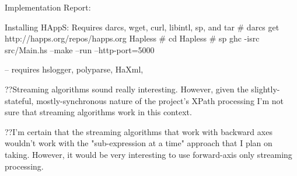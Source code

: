 Implementation Report:


Installing HAppS:
Requires darcs, wget, curl, libintl, sp, and tar
# darcs get http://happs.org/repos/happs.org Hapless
# cd Hapless
# sp ghc -isrc src/Main.hs --make --run --http-port=5000 

-- requires hslogger, polyparse, HaXml, 




??Streaming algorithms \cite{barton:streaming} sound really interesting.  However, given the slightly-stateful, mostly-synchronous nature of the project's XPath processing I'm not sure that streaming algorithms work in this context.  

??I'm certain that the streaming algorithms that work with backward axes wouldn't work with the "sub-expression at a time" approach that I plan on taking.  However, it would be very interesting to use forward-axis only streaming processing. 